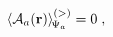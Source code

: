 \begin{equation}
\left\langle
{\mathcal A}_{a} ({\bf r})
\right\rangle_{\scriptstyle \!  \Psi_{a}}^{(>)}
= 0 
\; ,
\label{eq:anomaly_external_region}
\end{equation}

